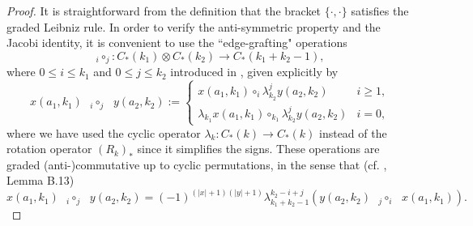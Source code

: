 \documentclass[a4paper]{article}
\numberwithin{equation}{section}
\begin{document}
\begin{proof}
It is straightforward from the definition that the bracket $\{\cdot,\cdot\}$ satisfies the graded Leibniz rule. In order to verify the anti-symmetric property and the Jacobi identity, it is convenient to use the ``edge-grafting" operations
\begin{equation}
{{}_i\circ_j}:C_\ast(k_1)\otimes C_\ast(k_2)\rightarrow C_\ast(k_1+k_2-1), 
\end{equation}
where $0\leq i\leq k_1$ and $0\leq j\leq k_2$ introduced in \cite{kwz}, given explicitly by
\begin{equation}
x(a_1,k_1)\textrm{ }{{}_i\circ_j}\textrm{ }y(a_2,k_2):=\left\{\begin{array}{ll}
x(a_1,k_1)\circ_i\lambda_{k_2}^jy(a_2,k_2) & i\geq1, \\
\lambda_{k_1}x(a_1,k_1)\circ_{k_1}\lambda_{k_2}^jy(a_2,k_2) & i=0,
\end{array}\right.
\end{equation}
where we have used the cyclic operator $\lambda_k:C_\ast(k)\rightarrow C_\ast(k)$ instead of the rotation operator $(R_k)_\ast$ since it simplifies the signs. These operations are graded (anti-)commutative up to cyclic permutations, in the sense that (cf. \cite{bw}, Lemma B.13)
\begin{equation}\label{eq:com}
x(a_1,k_1)\textrm{ }{{}_i\circ_j}\textrm{ }y(a_2,k_2)=(-1)^{(|x|+1)(|y|+1)}\lambda_{k_1+k_2-1}^{k_2-i+j}\left(y(a_2,k_2)\textrm{ }{{}_j\circ_i}\textrm{ }x(a_1,k_1)\right).
\end{equation}


\end{proof}
\end{document}
